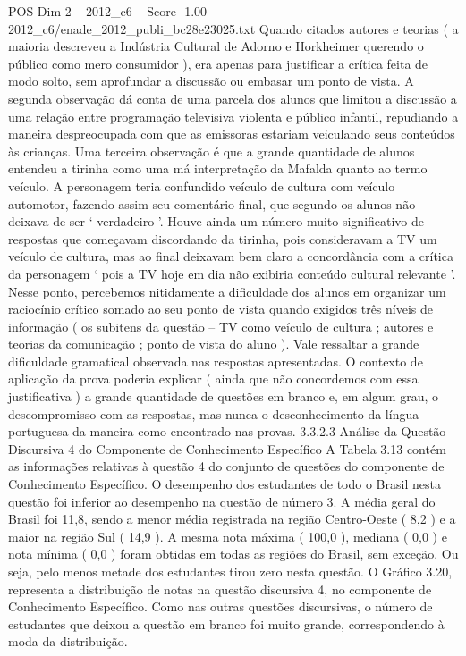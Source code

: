 \begin{textsample}{POS Dim 2 – 2012\_c6 – Score -1.00 – 2012\_c6/enade\_2012\_publi\_bc28e23025.txt}
Quando citados autores e teorias ( a maioria descreveu a Indústria Cultural de Adorno e Horkheimer querendo o público como mero consumidor ), era apenas para justificar a crítica feita de modo solto, sem aprofundar a discussão ou embasar um ponto de vista.
A segunda observação dá conta de uma parcela dos alunos que limitou a discussão a uma relação entre programação televisiva violenta e público infantil, repudiando a maneira despreocupada com que as emissoras estariam veiculando seus conteúdos às crianças.
Uma terceira observação é que a grande quantidade de alunos entendeu a tirinha como uma má interpretação da Mafalda quanto ao termo veículo.
A personagem teria confundido veículo de cultura com veículo automotor, fazendo assim seu comentário final, que segundo os alunos não deixava de ser ‘ verdadeiro ’.
Houve ainda um número muito significativo de respostas que começavam discordando da tirinha, pois consideravam a TV um veículo de cultura, mas ao final deixavam bem claro a concordância com a crítica da personagem ‘ pois a TV hoje em dia não exibiria conteúdo cultural relevante ’.
Nesse ponto, percebemos nitidamente a dificuldade dos alunos em organizar um raciocínio crítico somado ao seu ponto de vista quando exigidos três níveis de informação ( os subitens da questão – TV como veículo de cultura ; autores e teorias da comunicação ; ponto de vista do aluno ).
Vale ressaltar a grande dificuldade gramatical observada nas respostas apresentadas.
O contexto de aplicação da prova poderia explicar ( ainda que não concordemos com essa justificativa ) a grande quantidade de questões em branco e, em algum grau, o descompromisso com as respostas, mas nunca o desconhecimento da língua portuguesa da maneira como encontrado nas provas. 3.3.2.3 Análise da Questão Discursiva 4 do Componente de Conhecimento Específico A Tabela 3.13 contém as informações relativas à questão 4 do conjunto de questões do componente de Conhecimento Específico.
O desempenho dos estudantes de todo o Brasil nesta questão foi inferior ao desempenho na questão de número 3.
A média geral do Brasil foi 11,8, sendo a menor média registrada na região Centro-Oeste ( 8,2 ) e a maior na região Sul ( 14,9 ).
A mesma nota máxima ( 100,0 ), mediana ( 0,0 ) e nota mínima ( 0,0 ) foram obtidas em todas as regiões do Brasil, sem exceção.
Ou seja, pelo menos metade dos estudantes tirou zero nesta questão.
O Gráfico 3.20, representa a distribuição de notas na questão discursiva 4, no componente de Conhecimento Específico.
Como nas outras questões discursivas, o número de estudantes que deixou a questão em branco foi muito grande, correspondendo à moda da distribuição.

\end{textsample}
